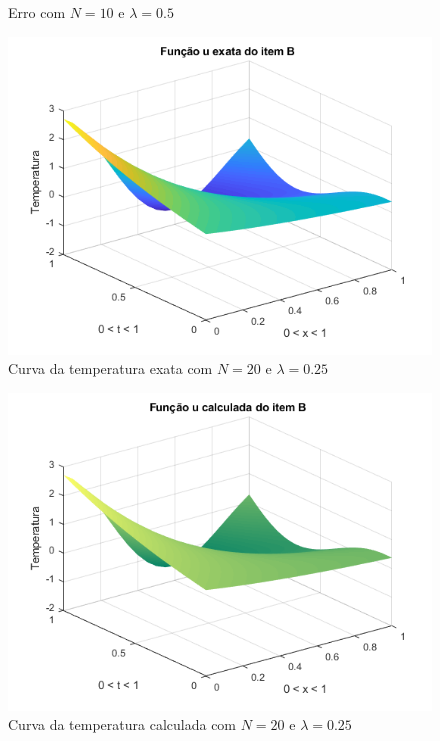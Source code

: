 \documentclass[12pt]{article}
\begin{document}
\begin{spacing}{1.5}
\begin{figure}
    \caption{Erro com $N=10$ e $\lambda=0.5$}
    \label{fig:B_n10lambda0-5_erro}
\end{figure}


\begin{figure}
    \centering
    \includegraphics[width=0.8\linewidth]{Primeira_Tarefa/ItemB/n20_lambda0-25_exata.png}
    \caption{Curva da temperatura exata com $N=20$ e $\lambda=0.25$}
    \label{fig:B_n20lambda0-25_exata}
\end{figure}
\begin{figure}
    \centering
    \includegraphics[width=0.8\linewidth]{Primeira_Tarefa/ItemB/n20_lambda0-25_calc.png}
    \caption{Curva da temperatura calculada com $N=20$ e $\lambda=0.25$}
    \label{fig:B_n20lambda0-25_calc}
\end{figure}
\begin{figure}
    \centering

\end{figure}
\end{spacing}
\end{document}
